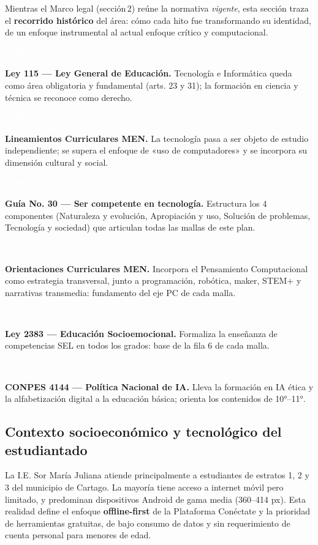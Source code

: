 \documentclass[12pt, a4paper]{article}
\begin{document}
Mientras el Marco legal (sección\,2) reúne la normativa \textit{vigente}, esta sección
traza el \textbf{recorrido histórico} del área: cómo cada hito fue transformando
su identidad, de un enfoque instrumental al actual enfoque crítico y computacional.

\medskip
\newcommand{\hitonorm}[2]{%
  \noindent\colorbox{vinoInst}{\textcolor{white}{\textbf{~#1~}}}\hspace{0.5em}%
  \begin{minipage}[t]{0.85\linewidth}#2\end{minipage}\par\smallskip
}
\hitonorm{1994}{\textbf{Ley 115 — Ley General de Educación.} Tecnología e
Informática queda como área obligatoria y fundamental (arts. 23 y 31); la
formación en ciencia y técnica se reconoce como derecho.}
\hitonorm{1996}{\textbf{Lineamientos Curriculares MEN.} La tecnología pasa a ser
objeto de estudio independiente; se supera el enfoque de «uso de computadores» y
se incorpora su dimensión cultural y social.}
\hitonorm{2008}{\textbf{Guía No. 30 — Ser competente en tecnología.} Estructura
los 4 componentes (Naturaleza y evolución, Apropiación y uso, Solución de
problemas, Tecnología y sociedad) que articulan todas las mallas de este plan.}
\hitonorm{2022}{\textbf{Orientaciones Curriculares MEN.} Incorpora el Pensamiento
Computacional como estrategia transversal, junto a programación, robótica, maker,
STEM+ y narrativas transmedia: fundamento del eje PC de cada malla.}
\hitonorm{2024}{\textbf{Ley 2383 — Educación Socioemocional.} Formaliza la
enseñanza de competencias SEL en todos los grados: base de la fila 6 de cada malla.}
\hitonorm{2025}{\textbf{CONPES 4144 — Política Nacional de IA.} Lleva la formación
en IA ética y la alfabetización digital a la educación básica; orienta los
contenidos de 10°–11°.}

\subsection{Contexto socioeconómico y tecnológico del estudiantado}

La I.E. Sor María Juliana atiende principalmente a estudiantes de estratos 1, 2
y 3 del municipio de Cartago. La mayoría tiene acceso a internet móvil pero
limitado, y predominan dispositivos Android de gama media (360–414 px). Esta
realidad define el enfoque \textbf{offline-first} de la Plataforma Conéctate
y la prioridad de herramientas gratuitas, de bajo consumo de datos y sin
requerimiento de cuenta personal para menores de edad.
\end{document}
